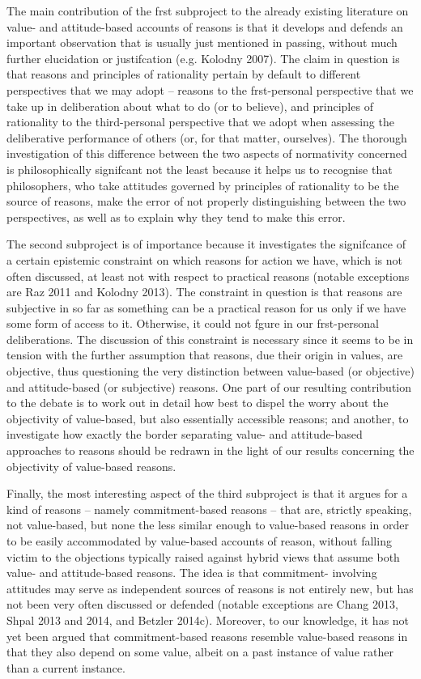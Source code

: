 The main contribution of the frst subproject to the already existing literature on value- and attitude-based accounts of reasons is that it develops and defends an important observation that is usually just mentioned in passing, without much further elucidation or justifcation (e.g. Kolodny 2007). The claim in question is that reasons and principles of rationality pertain by default to different perspectives that we may adopt – reasons to the frst-personal perspective that we take up in deliberation about what to do (or to believe), and principles of rationality to the third-personal perspective that we adopt when assessing the deliberative performance of others (or, for that matter, ourselves). The thorough investigation of this difference between the two aspects of normativity concerned is philosophically signifcant not the least because it helps us to recognise that philosophers, who take attitudes governed by principles of rationality to be the source of reasons, make the error of not properly distinguishing between the two perspectives, as well as to explain why they tend to make this error.

The second subproject is of importance because it investigates the signifcance of a certain epistemic constraint on which reasons for action we have, which is not often discussed, at least not with respect to practical reasons (notable exceptions are Raz 2011 and Kolodny 2013). The constraint in question is that reasons are subjective in so far as something can be a practical reason for us only if we have some form of access to it. Otherwise, it could not fgure in our frst-personal deliberations. The discussion of this constraint is necessary since it seems to be in tension with the further assumption that reasons, due their origin in values, are objective, thus questioning the very distinction between value-based (or objective) and attitude-based (or subjective) reasons. One part of our resulting contribution to the debate is to work out in detail how best to dispel the worry about the objectivity of value-based, but also essentially accessible reasons; and another, to investigate how exactly the border separating value- and attitude-based approaches to reasons should be redrawn in the light of our results concerning the objectivity of value-based reasons.

Finally, the most interesting aspect of the third subproject is that it argues for a kind of reasons – namely commitment-based reasons – that are, strictly speaking, not value-based, but none the less similar enough to value-based reasons in order to be easily accommodated by value-based accounts of reason, without falling victim to the objections typically raised against hybrid views that assume both value- and attitude-based reasons. The idea is that commitment- involving attitudes may serve as independent sources of reasons is not entirely new, but has not been very often discussed or defended (notable exceptions are Chang 2013, Shpal 2013 and 2014, and Betzler 2014c). Moreover, to our knowledge, it has not yet been argued that commitment-based reasons resemble value-based reasons in that they also depend on some value, albeit on a past instance of value rather than a current instance.
